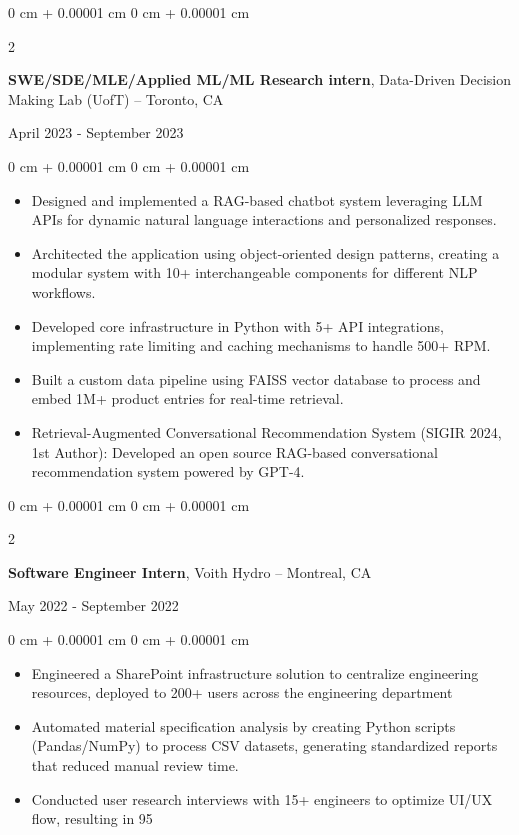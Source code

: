 \documentclass[11pt, letterpaper]{article}
\newenvironment{highlights}{
    \begin{itemize}[
        topsep=0.08 cm,
        parsep=0.08 cm,
        partopsep=0pt,
        itemsep=0pt,
        leftmargin=0.2 cm + 17pt
    ]
}
{
    \end{itemize}
}
\newenvironment{onecolentry}{
    \begin{adjustwidth}{
        0 cm + 0.00001 cm
    }{
        0 cm + 0.00001 cm
    }
}{
    \end{adjustwidth}
}
\newenvironment{twocolentry}[2][]{
    \onecolentry
    \def\secondColumn{#2}
    \setcolumnwidth{\fill, 4.5 cm}
    \begin{paracol}{2}
}{
    \switchcolumn \raggedleft \secondColumn
    \end{paracol}
    \endonecolentry
}
\begin{document}
\begin{twocolentry}{\footnotesize April 2023 - September 2023}
    {\textbf{SWE/SDE/MLE/Applied ML/ML Research intern}}, Data-Driven Decision Making Lab (UofT) -- Toronto, CA  
\end{twocolentry}  
\vspace{0.1cm}
\begin{onecolentry}
    \begin{highlights}
        \item Designed and implemented a RAG-based chatbot system leveraging LLM APIs for dynamic natural language interactions and personalized responses.
        \item Architected the application using object-oriented design patterns, creating a modular system with 10+ interchangeable components for different NLP workflows.
        \item Developed core infrastructure in Python with 5+ API integrations, implementing rate limiting and caching mechanisms to handle 500+ RPM.
        \item Built a custom data pipeline using FAISS vector database to process and embed 1M+ product entries for real-time retrieval.
        \item Retrieval-Augmented Conversational Recommendation System (SIGIR 2024, 1st Author): Developed an open source RAG-based conversational recommendation system powered by GPT-4.
    \end{highlights}
\end{onecolentry}

\vspace{0.15 cm}
\begin{twocolentry}{\footnotesize May 2022 - September 2022}
    {\textbf{Software Engineer Intern}}, Voith Hydro -- Montreal, CA
\end{twocolentry}
\vspace{0.05 cm}
\begin{onecolentry}
    \begin{highlights}
        \item Engineered a SharePoint infrastructure solution to centralize engineering resources, deployed to 200+ users across the engineering department
        \item Automated material specification analysis by creating Python scripts (Pandas/NumPy) to process CSV datasets, generating standardized reports that reduced manual review time.
        \item Conducted user research interviews with 15+ engineers to optimize UI/UX flow, resulting in 95%
    \end{highlights}
\end{onecolentry}
\end{document}
